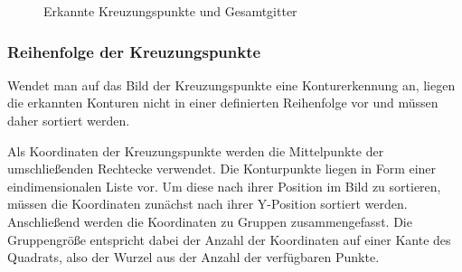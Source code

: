 \begin{figure}[H]
    \hfill
    \caption{Erkannte Kreuzungspunkte und Gesamtgitter}
\end{figure}


\subsubsection{Reihenfolge der Kreuzungspunkte}
Wendet man auf das Bild der Kreuzungspunkte eine Konturerkennung an, liegen die erkannten Konturen nicht in einer definierten Reihenfolge vor und müssen daher sortiert werden.

Als Koordinaten der Kreuzungspunkte werden die Mittelpunkte der umschließenden Rechtecke verwendet.
Die Konturpunkte liegen in Form einer eindimensionalen Liste vor. Um diese nach ihrer Position im Bild zu sortieren, müssen die Koordinaten zunächst nach ihrer Y-Position sortiert werden.
Anschließend werden die Koordinaten zu Gruppen zusammengefasst.
Die Gruppengröße entspricht dabei der Anzahl der Koordinaten auf einer Kante des Quadrats, also der Wurzel aus der Anzahl der verfügbaren Punkte.

